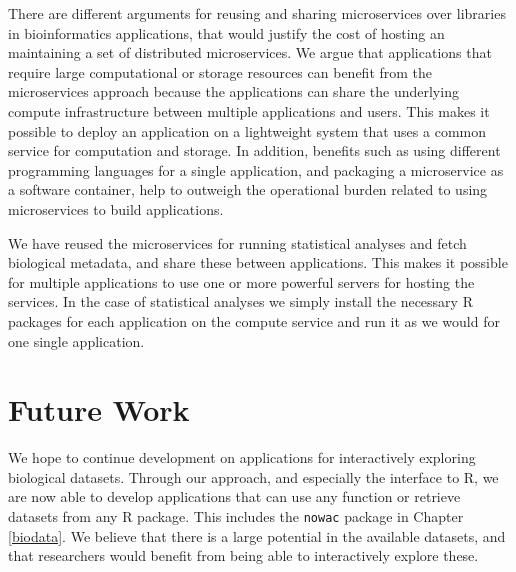 There are different arguments for reusing and sharing microservices over
libraries in bioinformatics applications, that would justify the cost of hosting
an maintaining a set of distributed microservices.  We argue that applications
that require large computational or storage resources can benefit from the
microservices approach because the applications can share the underlying compute
infrastructure between multiple applications and users.  This makes it possible
to deploy an application on a lightweight system that uses a common service for
computation and storage. In addition, benefits such as using different
programming languages for a single application, and packaging a microservice as
a software container, help to outweigh the operational burden related to using
microservices to build applications. 

We have reused the microservices for running statistical analyses and
fetch biological metadata, and share these between applications. This makes it
possible for multiple applications to use one or more powerful servers for
hosting the services. In the case of statistical analyses we simply install the
necessary R packages for each application on the compute service and run it as
we would for one single application. 

\section{Future Work} 
We hope to continue development on applications for interactively exploring
biological datasets. Through our approach, and especially the interface to R, 
we are now able to develop applications that can use any function or retrieve
datasets from any R package. This includes the \texttt{nowac} package in
Chapter \ref{biodata}. We believe that there is a large potential in the
available datasets, and that researchers would benefit from being able to
interactively explore these. 

